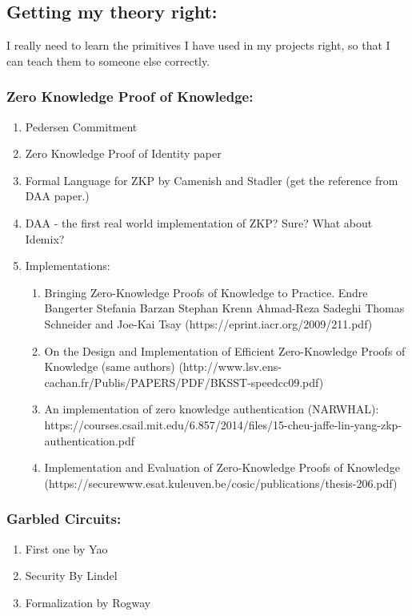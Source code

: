 \documentclass[11pt]{article}
\begin{document}
\subsection*{Getting my theory right:}
I really need to learn the primitives I have used in my  projects right, so that I can teach them to someone else correctly.\\

\subsubsection*{Zero Knowledge Proof of Knowledge:}
\begin{enumerate}
 \item Pedersen Commitment
 \item Zero Knowledge Proof of Identity paper
 \item Formal Language for ZKP by Camenish and Stadler (get the reference from DAA paper.)
 \item DAA - the first real world implementation of ZKP? Sure? What about Idemix?
 \item Implementations:
  \begin{enumerate}
   \item Bringing Zero-Knowledge Proofs of Knowledge to Practice. Endre Bangerter Stefania Barzan Stephan Krenn Ahmad-Reza Sadeghi Thomas Schneider 
and Joe-Kai Tsay (https://eprint.iacr.org/2009/211.pdf)
  \item On the Design and Implementation of Efficient Zero-Knowledge Proofs of Knowledge (same authors) 
(http://www.lsv.ens-cachan.fr/Publis/PAPERS/PDF/BKSST-speedcc09.pdf)
  \item An implementation of zero knowledge authentication (NARWHAL): 
https://courses.csail.mit.edu/6.857/2014/files/15-cheu-jaffe-lin-yang-zkp-authentication.pdf
  \item Implementation and Evaluation of Zero-Knowledge Proofs of Knowledge (https://securewww.esat.kuleuven.be/cosic/publications/thesis-206.pdf)
 \end{enumerate}
\end{enumerate}

\subsubsection*{Garbled Circuits:}
\begin{enumerate}
 \item First one by Yao
 \item Security By Lindel
 \item Formalization by Rogway
\end{enumerate}
\end{document}
